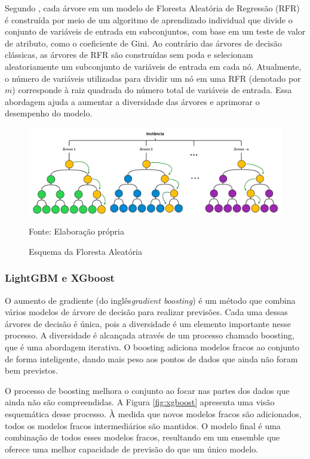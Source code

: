Segundo , cada árvore em um modelo de Floresta Aleatória de Regressão (RFR) é construída por meio de um algoritmo de aprendizado individual que divide o conjunto de variáveis de entrada em subconjuntos, com base em um teste de valor de atributo, como o coeficiente de Gini. Ao contrário das árvores de decisão clássicas, as árvores de RFR são construídas sem poda e selecionam aleatoriamente um subconjunto de variáveis de entrada em cada nó. Atualmente, o número de variáveis utilizadas para dividir um nó em uma RFR (denotado por $m$) corresponde à raiz quadrada do número total de variáveis de entrada. Essa abordagem ajuda a aumentar a diversidade das árvores e aprimorar o desempenho do modelo.

\begin{figure}[H]
	\centering
	\caption{Esquema da Floresta Aleatória}
	\label{fig:rf}
	\includegraphics[width=0.9\linewidth]{Modelos/Figuras/RF}
	
	Fonte: Elaboração própria
\end{figure}


\subsubsection{LightGBM e XGboost}\label{subsubsec:lgbxgb}

O aumento de gradiente (do inglês\textit{gradient boosting}) é um método que combina vários modelos de árvore de decisão para realizar previsões. Cada uma dessas árvores de decisão é única, pois a diversidade é um elemento importante nesse processo. A diversidade é alcançada através de um processo chamado boosting, que é uma abordagem iterativa. O boosting adiciona modelos fracos ao conjunto de forma inteligente, dando mais peso aos pontos de dados que ainda não foram bem previstos. 

O processo de boosting melhora o conjunto ao focar nas partes dos dados que ainda não são compreendidas. A Figura \ref{fig:xgboost} apresenta uma visão esquemática desse processo. À medida que novos modelos fracos são adicionados, todos os modelos fracos intermediários são mantidos. O modelo final é uma combinação de todos esses modelos fracos, resultando em um ensemble que oferece uma melhor capacidade de previsão do que um único modelo.

